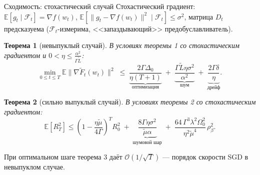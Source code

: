\documentclass[aspectratio=169, 12pt]{beamer}
\newtheorem{theorem_rus}{Теорема}
\begin{document}
\begin{frame}{Сходимость: стохастический случай}
\footnotesize
Стохастический градиент: $\mathbb{E}[ g_t \mid \mathcal{F}_t ] = \nabla f (w_t)$, $\mathbb{E}[ \|g_t - \nabla f(w_t)\|^2 \mid \mathcal{F}_t ] \leq \sigma^2$, матрица $D_t$ предсказуема ($\mathcal{F}_t$-измерима, <<запаздывающий>> предобуславливатель).
    \vspace{-0.1cm}
    \begin{theorem_rus}[невыпуклый случай]
    \label{theor:3}
    \footnotesize
    В условиях теоремы 1 со стохастическим градиентом и $0 < \eta \le \frac{\alpha^2}{\Gamma \widetilde{L}}$:
    \vspace{-0.2cm}
    \begin{equation*}
        \min_{0 \le t \le T} \mathbb{E}\|\nabla \widetilde{F}_t (w_t) \|^2 \;\le\; \underbrace{\frac{2\Gamma\Delta_0}{\eta (T+1)}}_{\text{оптимизация}} \;+\; \underbrace{\frac{\Gamma \widetilde{L} \eta \sigma^2}{\alpha^2}}_{\text{шум}} \;+\; \underbrace{\frac{2\Gamma\delta}{\eta}}_{\text{дрейф}}.
    \end{equation*}
    \vspace{-0.35cm}
\end{theorem_rus}
    \begin{theorem_rus}[сильно выпуклый случай]
    \label{theor:4}
    \footnotesize
    В условиях теоремы 2 со стохастическим градиентом:
    \vspace{-0.2cm}
    \begin{equation*}
        \mathbb{E} \left[ R_T^2 \right] \le \left(1 - \frac{\eta\widetilde{\mu}}{4\Gamma}\right)^T R_0^2 \;+\; \underbrace{\frac{8\Gamma\eta\sigma^2}{\widetilde{\mu}\alpha}}_{\text{шумовой шар}} \;+\; \frac{64\,\Gamma^3\lambda^2\Omega_0^2}{\eta^2\widetilde{\mu}^4}\,\rho_\beta^2 .
    \end{equation*}
    \vspace{-0.35cm}
\end{theorem_rus}
\vspace{-0.1cm}
При оптимальном шаге теорема 3 даёт $\mathcal{O}(1/\sqrt{T})$ --- порядок скорости SGD в невыпуклом случае.
\end{frame}
\end{document}
